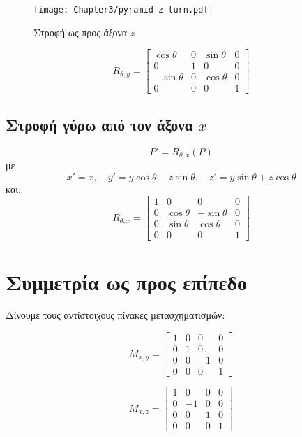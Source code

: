 \begin{figure}[hbt]
  \begin{center}
	\texttt{[image: Chapter3/pyramid-z-turn.pdf]}
  \end{center}
  \caption{Στροφή ως προς άξονα $z$}
\end{figure}



\[
R_{\theta, y} = 
\begin{bmatrix}
\cos{\theta} & 0 & \sin{\theta} & 0 \\
0 & 1 & 0 & 0 \\
-\sin{\theta} & 0 & \cos{\theta} & 0 \\
0 & 0 & 0 & 1
\end{bmatrix}
\]

\subsection{ Στροφή γύρω από τον άξονα \( x \)}

\[
P' = R_{\theta, x}(P)
\]
με
\[
x' = x, \quad y' = y \cos{\theta} - z \sin{\theta}, \quad z' = y \sin{\theta} + z \cos{\theta}
\]
και:
\[
R_{\theta, x} = 
\begin{bmatrix}
1 & 0 & 0 & 0 \\
0 & \cos \theta & -\sin \theta & 0 \\
0 & \sin \theta & \cos \theta & 0 \\
0 & 0 & 0 & 1
\end{bmatrix}
\]

\section{Συμμετρία ως προς επίπεδο}

Δίνουμε τους αντίστοιχους πίνακες μετασχηματισμών:

\[
M_{x, y} = 
\begin{bmatrix}
1 & 0 & 0 & 0 \\
0 & 1 & 0 & 0 \\
0 & 0 & -1 & 0 \\
0 & 0 & 0 & 1
\end{bmatrix}
\]

\[
M_{x, z} = 
\begin{bmatrix}
1 & 0 & 0 & 0 \\
0 & -1 & 0 & 0 \\
0 & 0 & 1 & 0 \\
0 & 0 & 0 & 1
\end{bmatrix}
\]

